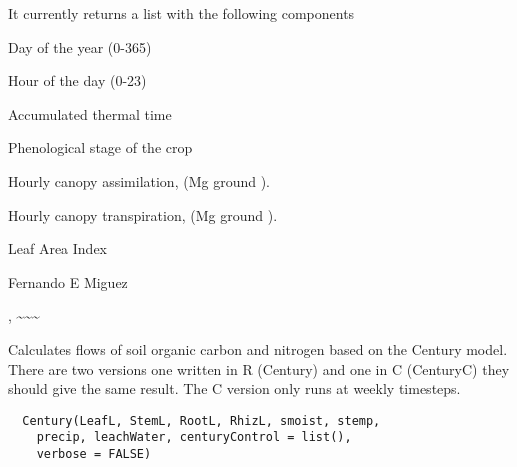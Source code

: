 \documentclass[letterpaper]{book}
\begin{document}
%
\begin{Value}
It currently returns a list with the following components

\begin{ldescription}
\item[\code{DayofYear}] Day of the year (0-365)

\item[\code{Hour}] Hour of the day (0-23)

\item[\code{TTTc}] Accumulated thermal time

\item[\code{PhenoStage}] Phenological stage of the crop

\item[\code{CanopyAssim}] Hourly canopy assimilation, (Mg
 ground ).

\item[\code{CanopyTrans}] Hourly canopy transpiration, (Mg
 ground ).

\item[\code{LAI}] Leaf Area Index
\end{ldescription}
\end{Value}
%
\begin{Author}\relax
Fernando E Miguez
\end{Author}
%
\begin{SeeAlso}\relax
{} 
, \textasciitilde{}\textasciitilde{}\textasciitilde{}
\end{SeeAlso}
%
\begin{Description}\relax
Calculates flows of soil organic carbon and nitrogen
based on the Century model. There are two versions one
written in R (Century) and one in C (CenturyC) they
should give the same result. The C version only runs at
weekly timesteps.
\end{Description}
%
\begin{Usage}
\begin{verbatim}
  Century(LeafL, StemL, RootL, RhizL, smoist, stemp,
    precip, leachWater, centuryControl = list(),
    verbose = FALSE)
\end{verbatim}
\end{Usage}
%
\end{document}
